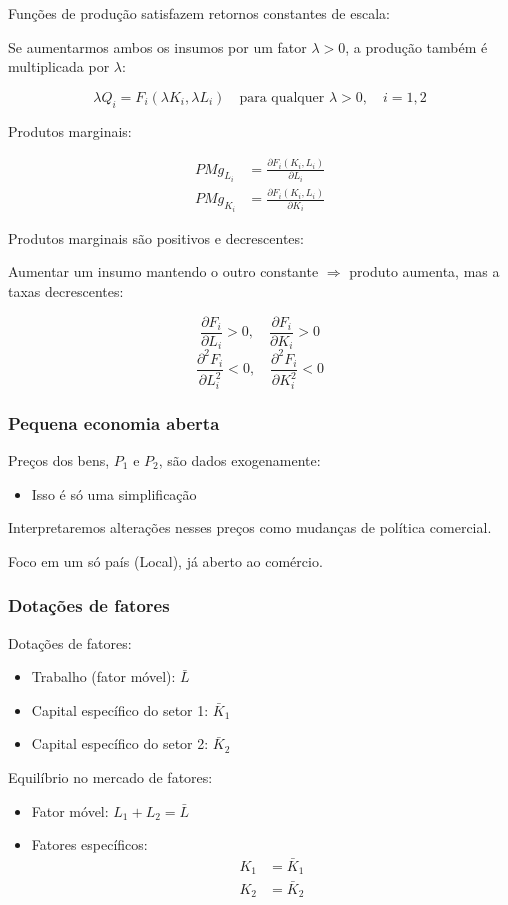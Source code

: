 \documentclass[a4paper,12pt]{article}[abntex2]
\begin{document}
Funções de produção satisfazem retornos constantes de escala:

Se aumentarmos ambos os insumos por um fator $\lambda > 0$, a produção também é multiplicada por $\lambda$:

\[
\lambda Q_i = F_i(\lambda K_i, \lambda L_i) \quad \text{para qualquer } \lambda > 0, \quad i = 1, 2
\]

Produtos marginais:

\begin{align*}
PMg_{L_i} &= \frac{\partial F_i(K_i, L_i)}{\partial L_i} \\
PMg_{K_i} &= \frac{\partial F_i(K_i, L_i)}{\partial K_i}
\end{align*}

Produtos marginais são positivos e decrescentes:

Aumentar um insumo mantendo o outro constante $\Rightarrow$ produto aumenta, mas a taxas decrescentes:

\[
\frac{\partial F_i}{\partial L_i} > 0, \quad \frac{\partial F_i}{\partial K_i} > 0
\]
\[
\frac{\partial^2 F_i}{\partial L_i^2} < 0, \quad \frac{\partial^2 F_i}{\partial K_i^2} < 0
\]

\subsubsection{\textbf{Pequena economia aberta}}
Preços dos bens, $P_1$ e $P_2$, são dados exogenamente:
\begin{itemize}
    \item Isso é só uma simplificação
\end{itemize}

Interpretaremos alterações nesses preços como mudanças de política comercial.

Foco em um só país (Local), já aberto ao comércio.

\subsubsection{\textbf{Dotações de fatores}}
Dotações de fatores:
\begin{itemize}
    \item Trabalho (fator móvel): $\bar{L}$
    \item Capital específico do setor 1: $\bar{K}_1$
    \item Capital específico do setor 2: $\bar{K}_2$
\end{itemize}

Equilíbrio no mercado de fatores:
\begin{itemize}
    \item Fator móvel: $L_1 + L_2 = \bar{L}$
    \item Fatores específicos:
    \begin{align*}
        K_1 &= \bar{K}_1 \\
        K_2 &= \bar{K}_2
    \end{align*}
\end{itemize}
\end{document}
